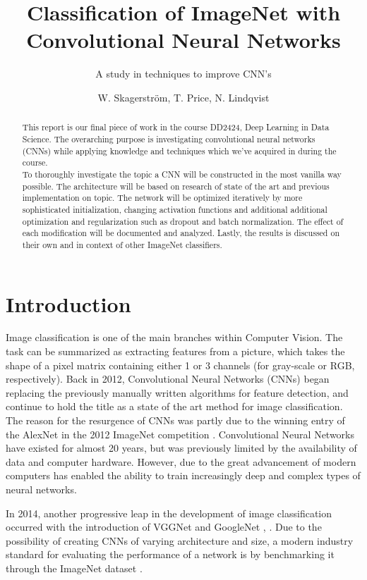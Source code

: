 \documentclass{kthreport}
\title{Classification of ImageNet with Convolutional Neural Networks}
\subtitle{A study in techniques to improve CNN's}
\author{W. Skagerström, T. Price, N. Lindqvist}
\begin{document}
\maketitle
\newpage
\begin{abstract}

\noindent This report is our final piece of work in the course DD2424, Deep Learning in Data Science. The overarching purpose is investigating convolutional neural networks (CNNs) while applying knowledge and techniques which we've acquired in during the course.\\

\noindent To thoroughly investigate the topic a CNN will be constructed in the most vanilla way possible. The architecture will be based on research of state of the art and previous implementation on topic. The network will be optimized iteratively by more sophisticated initialization, changing activation functions and additional additional optimization and regularization such as dropout and batch normalization. The effect of each modification will be documented and analyzed. Lastly, the results is discussed on their own and in context of other ImageNet classifiers.
\end{abstract}
\newpage

\tableofcontents
\newpage

\section{Introduction}
Image classification is one of the main branches within Computer Vision. The task can be summarized as extracting features from a picture, which takes the shape of a pixel matrix containing either 1 or 3 channels (for gray-scale or RGB, respectively). Back in 2012, Convolutional Neural Networks (CNNs) began replacing the previously manually written algorithms for feature detection, and continue to hold the title as a state of the art method for image classification. The reason for the resurgence of CNNs was partly due to the winning entry of the AlexNet in the 2012 ImageNet competition \cite{krizhevsky2012imagenet}. Convolutional Neural Networks have existed for almost 20 years, but was previously limited by the availability of data and computer hardware. However, due to the great advancement of modern computers has enabled the ability to train increasingly deep and complex types of neural networks.

In 2014, another progressive leap in the development of image classification occurred with the introduction of VGGNet and GoogleNet \cite{simonyan2014very}, \cite{szegedy2016rethinking}.  Due to the possibility of creating CNNs of varying architecture and size, a modern industry standard for evaluating the performance of a network is by benchmarking it through the ImageNet dataset \cite{russakovsky2015imagenet}.
\end{document}
